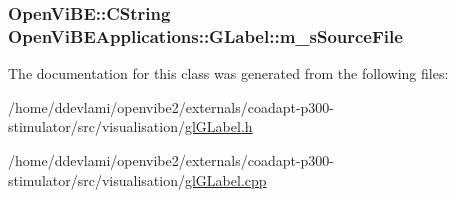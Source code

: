 \label{classOpenViBEApplications_1_1GLabel_af644cef82c93077e6c16e562c637dc55}
\hypertarget{classOpenViBEApplications_1_1GLabel_a0dda31dd749bffd354f974ce3099cdb7}{
\subsubsection[{m\_\-sSourceFile}]{\setlength{\rightskip}{0pt plus 5cm}OpenViBE::CString {\bf OpenViBEApplications::GLabel::m\_\-sSourceFile}}}
\label{classOpenViBEApplications_1_1GLabel_a0dda31dd749bffd354f974ce3099cdb7}


The documentation for this class was generated from the following files:\begin{DoxyCompactItemize}
\item 
/home/ddevlami/openvibe2/externals/coadapt-\/p300-\/stimulator/src/visualisation/\hyperlink{glGLabel_8h}{glGLabel.h}\item 
/home/ddevlami/openvibe2/externals/coadapt-\/p300-\/stimulator/src/visualisation/\hyperlink{glGLabel_8cpp}{glGLabel.cpp}\end{DoxyCompactItemize}
